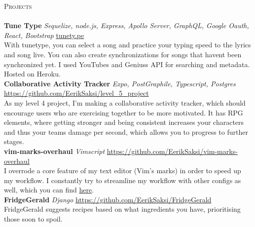 \documentclass[a4paper]{article}
\newcommand{\lineunder} {
    \vspace*{-8pt} \\
    \hspace*{-18pt} \hrulefill \\
}
\newcommand{\header} [1] {
    {\hspace*{-18pt}\vspace*{6pt} \textsc{#1}}
    \vspace*{-6pt} \lineunder
}
\begin{document}
\header{Projects}
    {\textbf{Tune Type}} {\sl Sequelize, node.js, Express, Apollo Server, GraphQL, Google Oauth, React, Bootstrap} \hfill \href{https://tunety.pe}{tunety.pe}\\
With tunetype, you can select a song and practice your typing speed to the lyrics and song live. You can also create synchronizations for songs that haven\textquotesingle{}t been synchronized yet. I used YouTube\textquotesingle{}s and Genius\textquotesingle{}s API for searching and metadata. Hosted on Heroku.\\
\vspace*{2mm}
    {\textbf{Collaborative Activity Tracker}} {\sl Expo, PostGraphile, Typescript, Postgres} \hfill \url{https://github.com/EerikSaksi/level_5_project}\\
As my level 4 project, I'm making a collaborative activity tracker, which should encourage users who are exercising together to be more motivated. It has RPG elements, where getting stronger and being consistent increases your characters and thus your teams damage per second, which allows you to progress to further stages.\\
\vspace*{2mm}
    {\textbf{vim-marks-overhaul}} {\sl Vimscript} \hfill \url{https://github.com/EerikSaksi/vim-marks-overhaul}\\
    I overrode a core feature of my text editor (Vim's marks) in order to speed up my workflow. I constantly try to streamline my workflow with other configs as well, which you can find  \href{https://github.com/EerikSaksi/dotfiles}{here}.  \\
\vspace*{2mm}
    {\textbf{FridgeGerald}} {\sl Django} \hfill \url{https://github.com/EerikSaksi/FridgeGerald}\\
FridgeGerald suggests recipes based on what ingredients you have, prioritising those soon to spoil.\\
\vspace*{2mm}

\ 
\end{document}
